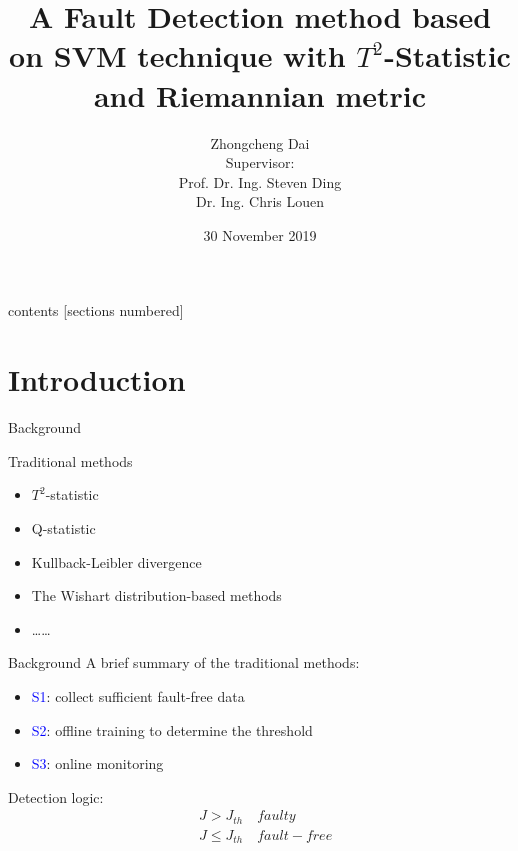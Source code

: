 \documentclass[10pt]{beamer}
\title{A Fault Detection method based on SVM technique with $T^2$-Statistic and Riemannian metric}
\author{Zhongcheng Dai  \\
 Supervisor: \\
 Prof. Dr. Ing. Steven Ding\\
Dr. Ing. Chris Louen 
}
\date{30 November 2019}
\institute{Automatic Control and Complex Systems}
\begin{document}
\maketitle
\begin{frame}{contents}
  [sections numbered]
  \tableofcontents[hideallsubsections]
\end{frame}
\section{Introduction}
\begin{frame}{Background}
    \begin{exampleblock}{Traditional methods}
	\begin{itemize}
    \item $T^2$-statistic
    \item Q-statistic
    \item Kullback-Leibler divergence
    \item The Wishart distribution-based methods
    \item \dots \dots
    \end{itemize}
    \end{exampleblock}
\end{frame}
\begin{frame}{Background}
 A brief summary of the traditional methods:
      \begin{itemize}
      \item \textcolor{blue}{S1}: collect sufficient fault-free data
      \item \textcolor{blue}{S2}: offline training to determine the threshold
      \item \textcolor{blue}{S3}: online monitoring  %
 	 \end{itemize}  
 Detection logic:
 \begin{equation}\nonumber
 \begin{aligned}
     &J > J_{th} \quad faulty \\
     &J \leq J_{th} \quad fault-free \\
     \end{aligned}
 \end{equation}
\end{frame}
\end{document}
